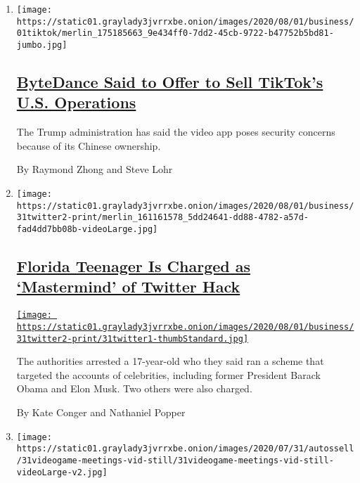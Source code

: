 \begin{enumerate}
\def\labelenumi{\arabic{enumi}.}
\item
  \texttt{[image: https://static01.graylady3jvrrxbe.onion/images/2020/08/01/business/01tiktok/merlin\_175185663\_9e434ff0-7dd2-45cb-9722-b47752b5bd81-jumbo.jpg]}

  \hypertarget{bytedance-said-to-offer-to-sell-tiktoks-us-operations}{%
  \subsection{\texorpdfstring{\href{/2020/08/01/technology/tiktok-sale-trump-ban.html}{ByteDance
  Said to Offer to Sell TikTok's U.S.
  Operations}}{ByteDance Said to Offer to Sell TikTok's U.S. Operations}}\label{bytedance-said-to-offer-to-sell-tiktoks-us-operations}}

  The Trump administration has said the video app poses security
  concerns because of its Chinese ownership.

  By Raymond Zhong and Steve Lohr
\item
  \texttt{[image: https://static01.graylady3jvrrxbe.onion/images/2020/08/01/business/31twitter2-print/merlin\_161161578\_5dd24641-dd88-4782-a57d-fad4dd7bb08b-videoLarge.jpg]}

  \hypertarget{florida-teenager-is-charged-as-mastermind-of-twitter-hack}{%
  \subsection{\texorpdfstring{\href{/2020/07/31/technology/twitter-hack-arrest.html}{Florida
  Teenager Is Charged as `Mastermind' of Twitter
  Hack}}{Florida Teenager Is Charged as `Mastermind' of Twitter Hack}}\label{florida-teenager-is-charged-as-mastermind-of-twitter-hack}}

  \href{/2020/07/31/technology/twitter-hack-arrest.html}{\texttt{[image: https://static01.graylady3jvrrxbe.onion/images/2020/08/01/business/31twitter2-print/31twitter1-thumbStandard.jpg]}}

  The authorities arrested a 17-year-old who they said ran a scheme that
  targeted the accounts of celebrities, including former President
  Barack Obama and Elon Musk. Two others were also charged.

  By Kate Conger and Nathaniel Popper
\item
  \texttt{[image: https://static01.graylady3jvrrxbe.onion/images/2020/07/31/autossell/31videogame-meetings-vid-still/31videogame-meetings-vid-still-videoLarge-v2.jpg]}


\end{enumerate}
